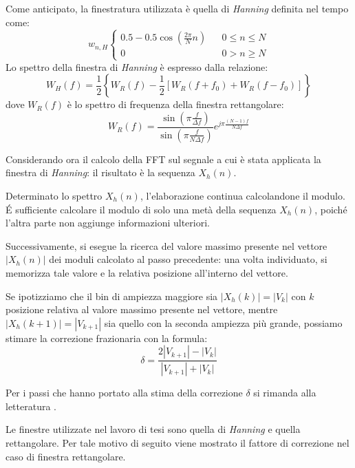 Come anticipato, la finestratura utilizzata è quella di \textit{Hanning} definita nel tempo come:	
\begin{equation}
w_{n,H}
\left\{\begin{matrix}
0.5 - 0.5\cos \left ( \frac{2 \pi}{N}n \right ) & & 0 \leq n \leq N \\ 
 0  &  & 0 > n \geq N
\end{matrix}\right.
\end{equation}
Lo spettro della finestra di \textit{Hanning} è espresso dalla relazione:
\begin{equation}
	W_H(f) = \frac{1}{2} \left \{ W_R (f) - \frac{1}{2} \left [ W_R (f+f_0) + W_R (f-f_0) \right ] \right \}
\end{equation}
dove $W_R (f)$ è lo spettro di frequenza della finestra rettangolare:
\begin{equation}
	W_R (f) = \frac{ \sin \left ( \pi \frac{f}{\Delta f} \right ) }{ \sin \left ( \pi \frac{f}{N \Delta f} \right ) } e^ { j \pi \frac{(N-1) f}{N \Delta f} }
\end{equation}

Considerando ora il calcolo della FFT sul segnale a cui è stata applicata la finestra di \textit{Hanning}: il risultato è la sequenza $X_h(n)$.

Determinato lo spettro $X_h(n)$, l'elaborazione continua calcolandone il modulo. \'E sufficiente calcolare il modulo di solo una metà della sequenza $X_h(n)$, poiché l'altra parte non aggiunge informazioni ulteriori.

Successivamente, si esegue la ricerca del valore massimo presente nel vettore $|X_h(n)|$ dei moduli calcolato al passo precedente: una volta individuato, si memorizza tale valore e la relativa posizione all'interno del vettore.

Se ipotizziamo che il bin di ampiezza maggiore sia $|X_h(k)|=|V_k|$ con $k$ posizione relativa al valore massimo presente nel vettore, mentre $|X_h(k+1)|=|V_{k+1}|$ sia quello con la seconda ampiezza più grande, possiamo stimare la correzione frazionaria  con la formula:
\begin{equation}
	\delta = \frac{2 |V_{k+1}|- |V_k|}{|V_{k+1}| + |V_k|}
\end{equation}

Per i passi che hanno portato alla stima della correzione $\delta$ si rimanda alla letteratura \cite{1007077}.

Le finestre utilizzate nel lavoro di tesi sono quella di \textit{Hanning} e quella rettangolare. Per tale motivo di seguito viene mostrato il fattore di correzione nel caso di finestra rettangolare.


